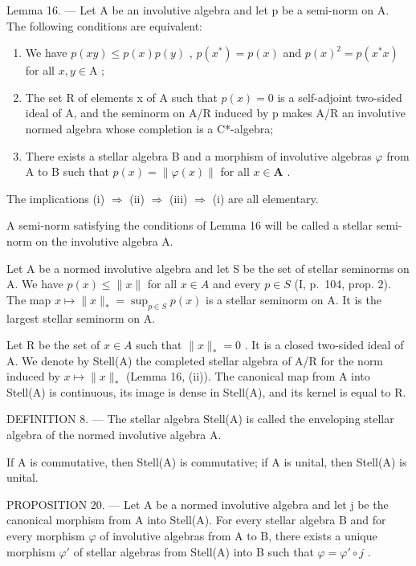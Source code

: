 Lemma 16. --- Let A be an involutive algebra and let p be a semi-norm on A. The following conditions are equivalent:

\begin{enumerate}
\def\labelenumi{(\roman{enumi})}
\item
  We have \(p(xy) \leqslant p(x)p(y)\) , \(p(x^{*}) = p(x)\) and \(p(x)^{2} = p(x^{*}x)\) for all \(x, y \in \mathrm{A}\) ;
\item
  The set R of elements x of A such that \(p(x) = 0\) is a self-adjoint two-sided ideal of A, and the seminorm on A/R induced by p makes A/R an involutive normed algebra whose completion is a C*-algebra;
\item
  There exists a stellar algebra B and a morphism of involutive algebras \(\varphi\) from A to B such that \(p(x) = \|\varphi(x)\|\) for all \(x\in\mathbf{A}\) .
\end{enumerate}

The implications (i) \(\Longrightarrow\) (ii) \(\Longrightarrow\) (iii) \(\Longrightarrow\) (i) are all elementary.

A semi-norm satisfying the conditions of Lemma 16 will be called a stellar semi-norm on the involutive algebra A.

Let A be a normed involutive algebra and let S be the set of stellar seminorms on A. We have \(p(x) \leqslant \|x\|\) for all \(x \in A\) and every \(p \in S\) (I, p.~104, prop. 2). The map \(x \mapsto \|x\|_* = \sup_{p \in S} p(x)\) is a stellar seminorm on A. It is the largest stellar seminorm on A.

Let R be the set of \(x \in A\) such that \(\|x\|_{*} = 0\) . It is a closed two-sided ideal of A. We denote by Stell(A) the completed stellar algebra of A/R for the norm induced by \(x \mapsto \|x\|_{*}\) (Lemma 16, (ii)). The canonical map from A into Stell(A) is continuous, its image is dense in Stell(A), and its kernel is equal to R.

DEFINITION 8. --- The stellar algebra Stell(A) is called the enveloping stellar algebra of the normed involutive algebra A.

If A is commutative, then Stell(A) is commutative; if A is unital, then Stell(A) is unital.

PROPOSITION 20. --- Let A be a normed involutive algebra and let j be the canonical morphism from A into Stell(A). For every stellar algebra B and for every morphism \(\varphi\) of involutive algebras from A to B, there exists a unique morphism \(\varphi'\) of stellar algebras from Stell(A) into B such that \(\varphi = \varphi' \circ j\) .


